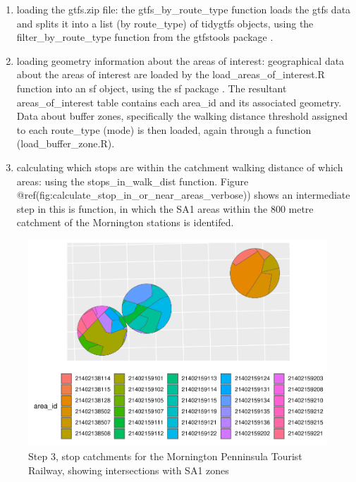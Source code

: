 \documentclass[preprint, 3p,
authoryear]{elsarticle} %
\begin{document}
\begin{enumerate}
\def\labelenumi{(\arabic{enumi})}
\item
  loading the gtfs.zip file: the gtfs\_by\_route\_type function loads
  the gtfs data and splits it into a list (by route\_type) of tidygtfs
  objects, using the filter\_by\_route\_type function from the gtfstools
  package \citep{filter_GTFS_by_mode}.
\item
  loading geometry information about the areas of interest: geographical
  data about the areas of interest are loaded by the
  load\_areas\_of\_interest.R function into an sf object, using the sf
  package \citep{R-sf}. The resultant areas\_of\_interest table contains
  each area\_id and its associated geometry. Data about buffer zones,
  specifically the walking distance threshold assigned to each
  route\_type (mode) is then loaded, again through a function
  (load\_buffer\_zone.R).
\item
  calculating which stops are within the catchment walking distance of
  which areas: using the stops\_in\_walk\_dist function. Figure
  @ref(fig:calculate\_stop\_in\_or\_near\_areas\_verbose)) shows an
  intermediate step in this is function, in which the SA1 areas within
  the 800 metre catchment of the Mornington stations is identifed.
\end{enumerate}

\begin{figure}
\includegraphics[width=1\linewidth]{Leveraging_GTFS_to_assess_transit_supply_Transport_Geography_files/figure-latex/calculate_stop_in_or_near_areas_verbose-1} \caption{Step 3, stop catchments for the Mornington Penninsula Tourist Railway, showing intersections with SA1 zones}\label{fig:calculate_stop_in_or_near_areas_verbose}
\end{figure}
\end{document}

